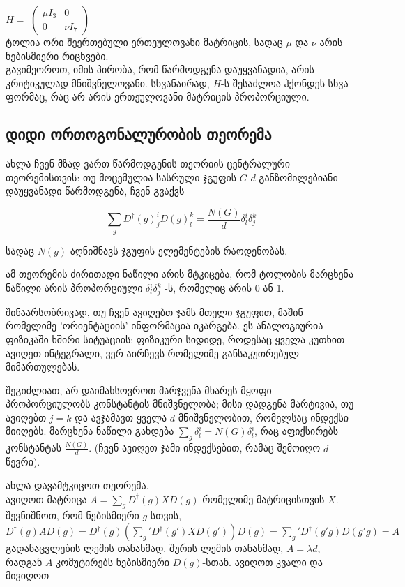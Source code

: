 \documentclass[12pt]{article}
\begin{document}
\begin{sloppypar}
$H = $
$
\begin{pmatrix}
\mu I_3 & 0\\
0 & \nu I_7
\end{pmatrix}
$ \\

ტოლია ორი შეერთებული ერთეულოვანი მატრიცის, სადაც $\mu$ და $\nu$ არის ნებისმიერი რიცხვები.\\

გავიმეოროთ, იმის პირობა, რომ წარმოდგენა დაუყვანადია, არის კრიტიკულად მნიშვნელოვანი. სხვანაირად, $H$-ს შესაძლოა ჰქონდეს სხვა ფორმაც, რაც არ არის ერთეულოვანი მატრიცის პროპორციული.

\subsection{დიდი ორთოგონალურობის თეორემა}

ახლა ჩვენ მზად ვართ წარმოდგენის თეორიის ცენტრალური თეორემისთვის: თუ მოცემულია სასრული ჯგუფის $G$  $d$-განზომილებიანი დაუყვანადი წარმოდგენა, ჩვენ გვაქვს 

\begin{equation} \label{Great orthogonality theorem}
		\sum_{g}D^{\dagger}(g)^i_jD(g)^k_l = \frac{N(G)}{d}\delta^i_l\delta^k_j
\end{equation}

სადაც $N(g)$ აღნიშნავს ჯგუფის ელემენტების რაოდენობას.

ამ თეორემის ძირითადი ნაწილი არის მტკიცება, რომ ტოლობის მარცხენა ნაწილი არის პროპორციული $\delta^i_l\delta^k_j$ -ს, რომელიც არის 0 ან 1.

შინაარსობრივად, თუ ჩვენ ავიღებთ ჯამს მთელი ჯგუფით, მაშინ რომელიმე 'ორიენტაციის' ინფორმაცია იკარგება. ეს ანალოგიურია ფიზიკაში ხშირი სიტუაციის: ფიზიკური სიდიდე, როდესაც ყველა კუთხით ავიღეთ ინტეგრალი, ვერ აირჩევს რომელიმე განსაკუთრებულ მიმართულებას.

შეგიძლიათ, არ დაიმახსოვროთ მარჯვენა მხარეს მყოფი პროპორციულობს კონსტანტის მნიშვნელობა; მისი დადგენა მარტივია, თუ ავიღებთ $j=k$ და ავჯამავთ ყველა $d$ მნიშვნელობით, რომელსაც ინდექსი მიიღებს. მარცხენა ნაწილი გახდება $\sum_g \delta^i_l=N(G)\delta^i_l$, რაც აფიქსირებს კონსტანტას $\frac{N(G)}{d}$. (ჩვენ ავიღეთ ჯამი ინდექსებით, რამაც შემოიღო $d$ წევრი).

ახლა დავამტკიცოთ თეორემა.\\

ავიღოთ მატრიცა $A=\sum_gD^{\dagger}(g)XD(g)$ რომელიმე მატრიცისთვის $X$. შევნიშნოთ, რომ ნებისმიერი $g$-სთვის, 
$
D^{\dagger}(g)AD(g)=
D^{\dagger}(g)(\sum_g'D^{\dagger}(g')XD(g'))D(g)=
\sum_g' D^{\dagger}(g'g)D(g'g)=
A
$
გადანაცვლების ლემის თანახმად. შურის ლემის თანახმად, $A=\lambda d$, რადგან $A$ კომუტირებს ნებისმიერი $D(g)$-სთან. ავიღოთ კვალი და მივიღოთ 


\end{sloppypar}
\end{document}
